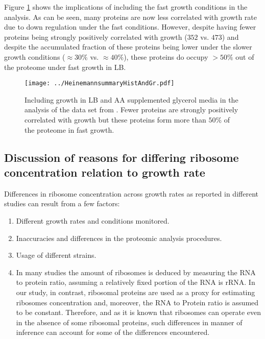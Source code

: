 \documentclass{article}
\newcommand{\hGlobal}{$473$}
\newcommand{\hGlobalLB}{$352$}
\begin{document}
Figure \ref{fig:LB} shows the implications of including the fast growth conditions in the analysis.
As can be seen, many proteins are now less correlated with growth rate due to down regulation under the fast conditions.
However, despite having fewer proteins being strongly positively correlated with growth (\hGlobalLB{} vs. \hGlobal{}) and despite the accumulated fraction of these proteins being lower under the slower growth conditions ($\approx30\%$ vs. $\approx40\%$), these proteins do occupy $>50\%$ out of the proteome under fast growth in LB.

\begin{figure}[H]
\begin{center}
\texttt{[image: ../HeinemannsummaryHistAndGr.pdf]}
\caption{\label{fig:LB}
Including growth in LB and AA supplemented glycerol media in the analysis of the data set from \cite{Schmidt2015}.
Fewer proteins are strongly positively correlated with growth but these proteins form more than $50\%$ of the proteome in fast growth.%
}
\end{center}
\end{figure}

\subsection{Discussion of reasons for differing ribosome concentration relation to growth rate}
\label{ribosomeconc} 

Differences in ribosome concentration  across growth rates as reported in different studies can result from a few factors:
\begin{enumerate}
\item Different growth rates and conditions monitored.
\item Inaccuracies and differences in the proteomic analysis procedures.
\item Usage of different strains.
\item In many studies the amount of ribosomes is deduced by measuring the RNA to protein ratio, assuming a relatively fixed portion of the RNA is rRNA.
In our study, in contrast, ribosomal proteins are used as a proxy for estimating ribosomes concentration and, moreover, the RNA to Protein ratio is assumed to be constant.
Therefore, and as it is known that ribosomes can operate even in the absence of some ribosomal proteins, such differences in manner of inference can account for some of the differences encountered.
\end{enumerate}
\end{document}
